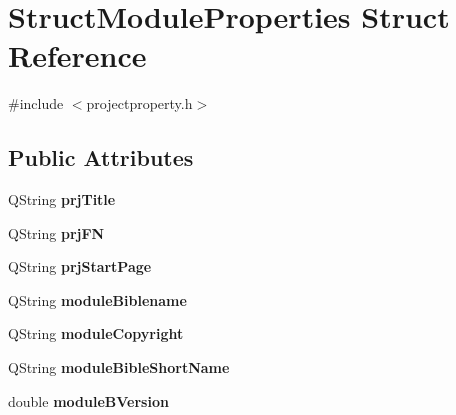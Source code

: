 \hypertarget{structStructModuleProperties}{
\section{StructModuleProperties Struct Reference}
\label{structStructModuleProperties}
}


{\ttfamily \#include $<$projectproperty.h$>$}

\subsection*{Public Attributes}
\begin{DoxyCompactItemize}
\item 
\hypertarget{structStructModuleProperties_a3a8b3cacaf47da44ee3393ab8ff4ae69}{
QString {\bfseries prjTitle}}
\label{structStructModuleProperties_a3a8b3cacaf47da44ee3393ab8ff4ae69}

\item 
\hypertarget{structStructModuleProperties_a387b84f5272982a8adefa42e87b18fc0}{
QString {\bfseries prjFN}}
\label{structStructModuleProperties_a387b84f5272982a8adefa42e87b18fc0}

\item 
\hypertarget{structStructModuleProperties_a924e57789f080b6c6fe564a4223889fd}{
QString {\bfseries prjStartPage}}
\label{structStructModuleProperties_a924e57789f080b6c6fe564a4223889fd}

\item 
\hypertarget{structStructModuleProperties_a0fbcb8db053083bdec5a6d04cc8c4142}{
QString {\bfseries moduleBiblename}}
\label{structStructModuleProperties_a0fbcb8db053083bdec5a6d04cc8c4142}

\item 
\hypertarget{structStructModuleProperties_aea28d87d877bb949b8e63cb07fc4772b}{
QString {\bfseries moduleCopyright}}
\label{structStructModuleProperties_aea28d87d877bb949b8e63cb07fc4772b}

\item 
\hypertarget{structStructModuleProperties_a5b354e6cc946088c6a0f91792e18f68b}{
QString {\bfseries moduleBibleShortName}}
\label{structStructModuleProperties_a5b354e6cc946088c6a0f91792e18f68b}

\item 
\hypertarget{structStructModuleProperties_a5a7750aca6da4714317fc029825be8e5}{
double {\bfseries moduleBVersion}}
\label{structStructModuleProperties_a5a7750aca6da4714317fc029825be8e5}


\end{DoxyCompactItemize}
